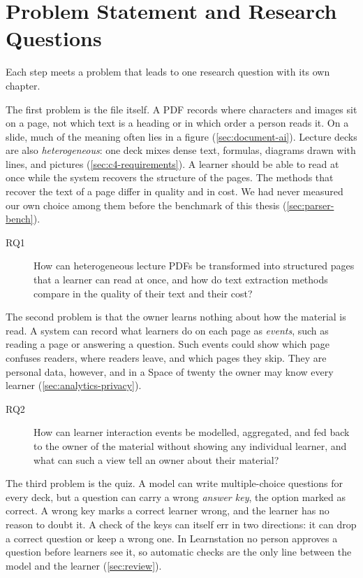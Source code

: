 \section{Problem Statement and Research Questions}
\label{sec:problem}
\label{sec:research-questions}

Each step meets a problem that leads to one research question with its own
chapter.

The first problem is the file itself. A PDF records where characters and
images sit on a page, not which text is a heading or in which order a person
reads it. On a slide, much of the meaning often lies in a figure
(\cref{sec:document-ai}). Lecture decks are also \emph{heterogeneous}: one
deck mixes dense text, formulas, diagrams drawn with lines, and pictures
(\cref{sec:c4-requirements}). A learner should be able to read at once while
the system recovers the structure of the pages. The methods that recover the
text of a page differ in quality and in cost. We had never measured our own
choice among them before the benchmark of this thesis
(\cref{sec:parser-bench}).

\begin{description}
  \item[RQ1] How can heterogeneous lecture PDFs be transformed into
    structured pages that a learner can read at once, and how do text
    extraction methods compare in the quality of their text and their cost?
\end{description}

The second problem is that the owner learns nothing about how the material is
read. A system can record what learners do on each page as \emph{events}, such
as reading a page or answering a question. Such events could show which page
confuses readers, where readers leave, and which pages they skip. They are
personal data, however, and in a Space of twenty the owner may know every
learner (\cref{sec:analytics-privacy}).

\begin{description}
  \item[RQ2] How can learner interaction events be modelled, aggregated, and
    fed back to the owner of the material without showing any individual
    learner, and what can such a view tell an owner about their material?
\end{description}

The third problem is the quiz. A model can write multiple-choice questions for
every deck, but a question can carry a wrong \emph{answer key}, the option
marked as correct. A wrong key marks a correct learner wrong, and the learner
has no reason to doubt it. A check of the keys can itself err in two
directions: it can drop a correct question or keep a wrong one. In
Learnstation no person approves a question before learners see it, so
automatic checks are the only line between the model and the learner
(\cref{sec:review}).

